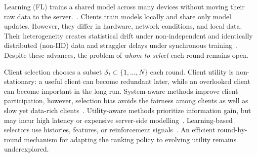 \documentclass[journal]{IEEEtran}
\newcommand{\revision}[1]{#1}
\begin{document}
 Learning (FL) trains a shared model across many devices without moving their raw data to the server.~\cite{mcmahan2017communication}. \revision{Clients train models locally and share only model updates. However, they differ in hardware, network conditions, and local data. Their heterogeneity creates statistical drift under non-independent and identically distributed (non-IID) data and straggler delays under synchronous training}~\cite{karimireddy2020scaffold,mai2024study,tapwal2026stragglers,forootani2026asynchronous,borazjani2026redefining}. Despite these advances, the problem of \textit{whom to select} each round remains open.

Client selection chooses a subset $\revision{\mathcal{S}_t} \subset \{1, \ldots, N\}$ each round. \revision{Client utility is non-stationary: a useful client can become redundant later, while an overlooked client can become important in the long run.} System-aware methods improve client participation, however, selection bias avoids the fairness among clients as well as slow yet data-rich clients~\cite{nishio2019client,chai2020tifl}. Utility-aware methods prioritize information gain, but may incur high latency or expensive server-side modelling~\cite{lai2021oort,tang2022fedcor,xu2024federated,yan2023criticalfl,ning2024fedgcs}. Learning-based selectors use histories, features, or reinforcement signals~\cite{wang2020optimizing,pan2024contextual,kazemi2026robust}. \revision{An efficient round-by-round mechanism for adapting the ranking policy to evolving utility remains underexplored.}
\end{document}
